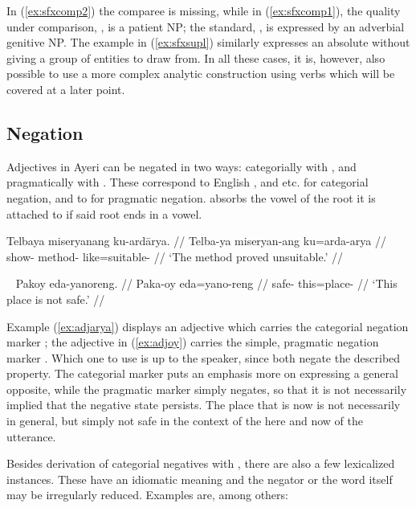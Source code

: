 In (\ref{ex:sfxcomp2}) the comparee is missing, while in (\ref{ex:sfxcomp1}), 
the quality under comparison, , is a patient NP; the standard, , is 
expressed by an adverbial genitive NP. The example in (\ref{ex:sfxsupl}) 
similarly expresses an absolute without giving a group of entities to draw 
from. 
In all these cases, it is, however, also possible to use a more complex 
analytic construction using verbs which will be covered at a later point.


\subsection{Negation}

Adjectives in Ayeri can be negated in two ways: categorially with 
, and pragmatically with . These correspond to 
English , and  etc. for categorial negation, and to 
 for pragmatic negation.  absorbs the vowel of the root 
it is attached to if said root ends in a vowel.

\ex\label{ex:adjarya}\begingl
	\gla Telbaya miseryanang ku-ardārya. //
	\glb Telba-ya miseryan-ang ku=arda-arya //
	\glc show-\TsgM{} method-\Aarg{} like=suitable-\Neg{} //
	\glft `The method proved unsuitable.' //
\endgl\xe

\ex~\label{ex:adjoy}\begingl
	\gla Pakoy eda-yanoreng. //
	\glb Paka-oy eda=yano-reng //
	\glc safe-\Neg{} this=place-\AargI{} //
	\glft `This place is not safe.' //
\endgl\xe

Example (\ref{ex:adjarya}) displays an adjective which carries the categorial 
negation marker ; the adjective in (\ref{ex:adjoy}) carries 
the simple, pragmatic negation marker . Which one to use is up 
to the speaker, since both negate the described property. The categorial marker 
puts an emphasis more on expressing a general opposite, while the pragmatic 
marker simply negates, so that it is not necessarily implied that the negative 
state persists. The place that is  now is not 
necessarily  in general, but simply not safe in 
the context of the here and now of the utterance.

Besides  derivation of categorial negatives with , 
there are also a few lexicalized instances. These have an idiomatic meaning and 
the negator or the word itself may be irregularly reduced. Examples are, among 
others:

